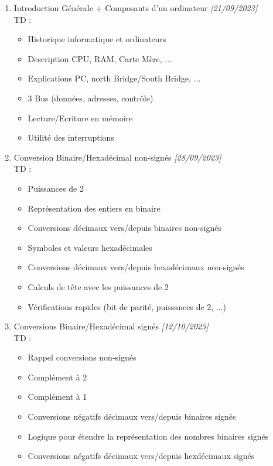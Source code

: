 \documentclass[11pt,a4paper]{article}
\begin{document}
\begin{enumerate}
\item Introduction Générale + Composants d'un ordinateur \textit{[21/09/2023]}\\
  TD :
  \begin{itemize}
  \item Historique informatique et ordinateurs
  \item Description CPU, RAM, Carte Mère, ...
  \item Explications PC, north Bridge/South Bridge, ...
  \item 3 Bus (données, adresses, contrôle)
  \item Lecture/Ecriture en mémoire
  \item Utilité des interruptions
  \end{itemize}

\medskip

\item Conversion Binaire/Hexadécimal non-signés \textit{[28/09/2023]}\\
  TD :
  \begin{itemize}
  \item Puissances de 2
  \item Représentation des entiers en binaire
  \item Conversions décimaux vers/depuis binaires non-signés
  \item Symboles et valeurs hexadécimales
  \item Conversions décimaux vers/depuis hexadécimaux non-signés
  \item Calculs de tête avec les puissances de 2
  \item Vérifications rapides (bit de parité, puissances de 2, ...)
  \end{itemize}

\medskip

\item Conversions Binaire/Hexadécimal signés \textit{[12/10/2023]}\\
  TD :
  \begin{itemize}
  \item Rappel conversions non-signés
  \item Complément à 2
  \item Complément à 1
  \item Conversions négatifs décimaux vers/depuis binaires signés
  \item Logique pour étendre la représentation des nombres binaires signés
  \item Conversions négatifs décimaux vers/depuis hexdécimaux signés
  \end{itemize}


\end{enumerate}
\end{document}
